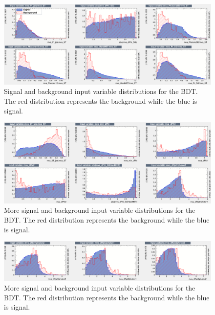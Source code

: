 \begin{figure}[h]
	\centering
	\includegraphics[width=1.7\linewidth, height=0.5\textheight, angle=90]{Figures/BDTvar1}
	\caption[BDT input variables 1]{Signal and background input variable distributions for the BDT.  The red distribution represents the background while the blue is signal.}
	\label{fig:bdtvar1}
\end{figure}

\begin{figure}[h]
	\centering
	\includegraphics[width=1.7\linewidth, height=0.5\textheight, angle=90]{Figures/BDTvar2}
	\caption[BDT input variables 2]{More signal and background input variable distributions for the BDT.  The red distribution represents the background while the blue is signal.}
	\label{fig:bdtvar2}
\end{figure}

\begin{figure}[h]
	\centering
	\includegraphics[width=1.7\linewidth, height=0.3\textheight, angle=90]{Figures/BDTvar3}
	\caption[BDT input variables 3]{More signal and background input variable distributions for the BDT.  The red distribution represents the background while the blue is signal.}
	\label{fig:bdtvar3}
\end{figure}

